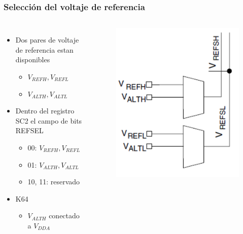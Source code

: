 \documentclass[10.5pt,scale=1.0,t,aspectratio=169,hyperref={pdfpagelabels=false}]{beamer}
\begin{document}
\begin{frame}
	\frametitle{Selección del voltaje de referencia}
	{\small
		\begin{columns}
			\begin{itemize}
				\item Dos pares de voltaje de referencia estan disponibles
				\begin{itemize}
					\item $V_{REFH}, V_{REFL}$
					\item $V_{ALTH}, V_{ALTL}$
				\end{itemize}
				\item Dentro del registro SC2 el campo de bits REFSEL
				\begin{itemize}
					\item 00: $V_{REFH}, V_{REFL}$
					\item 01: $V_{ALTH}, V_{ALTL}$
					\item 10, 11: reservado
				\end{itemize}
				\item K64
				\begin{itemize}
					\item $V_{ALTH}$ conectado a $V_{DDA}$
				\end{itemize}
			\end{itemize}
			
			\begin{figure}
				\centering
				\includegraphics[scale=0.4]{fig_VoltageReference}
			\end{figure}
		\end{columns}
	}
\end{frame}
\end{document}
